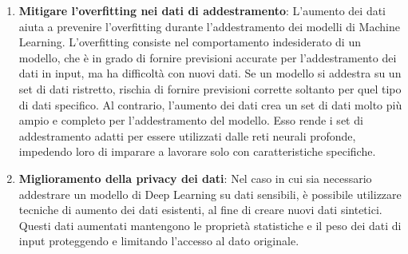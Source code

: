 \documentclass[12pt,a4paper,openright,twoside]{book}
\begin{document}
\begin{enumerate}
\item \textbf{Mitigare l'overfitting nei dati di addestramento}:
L'aumento dei dati aiuta a prevenire l'overfitting durante l'addestramento dei modelli di Machine Learning. L'overfitting consiste nel comportamento indesiderato di un modello, che è in grado di fornire previsioni accurate per l'addestramento dei dati in input, ma ha difficoltà con nuovi dati. Se un modello si addestra su un set di dati ristretto, rischia di fornire previsioni corrette soltanto per quel tipo di dati specifico. Al contrario, l'aumento dei dati crea un set di dati molto più ampio e completo per l'addestramento del modello. Esso rende i set di addestramento adatti per essere utilizzati dalle reti neurali profonde, impedendo loro di imparare a lavorare solo con caratteristiche specifiche.

\item \textbf{Miglioramento della privacy dei dati}:
Nel caso in cui sia necessario addestrare un modello di Deep Learning su dati sensibili, è possibile utilizzare tecniche di aumento dei dati esistenti, al fine di creare nuovi dati sintetici. Questi dati aumentati mantengono le proprietà statistiche e il peso dei dati di input proteggendo e limitando l'accesso al dato originale.
\end{enumerate}
\end{document}

